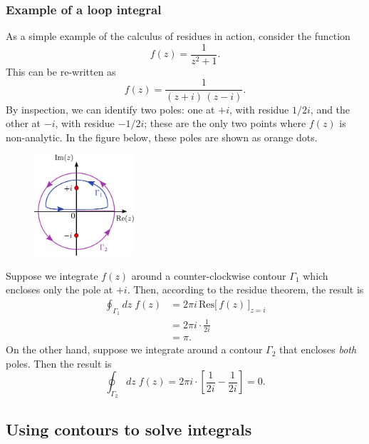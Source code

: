 \documentclass[10pt,a4paper]{article}
\begin{document}
\subsubsection{Example of a loop integral}
\label{example-of-a-loop-integral}

As a simple example of the calculus of residues in action, consider the
function
\begin{equation}
f(z) = \frac{1}{z^2 + 1}.
\end{equation}
This can be re-written as
\begin{equation}
f(z) = \frac{1}{(z + i)\,(z-i)}.
\end{equation}
By inspection, we can identify two poles: one at $+i$, with residue
$1/2i$, and the other at $-i$, with residue $-1/2i$; these are the
only two points where $f(z)$ is non-analytic. In the figure below,
these poles are shown as orange dots.

\begin{figure}[h]
  \centering\includegraphics[width=0.33\textwidth]{contour_example1}
\end{figure}

Suppose we integrate $f(z)$ around a counter-clockwise contour
$\Gamma_1$ which encloses only the pole at $+i$. Then, according to
the residue theorem, the result is
\begin{align}
  \oint_{\Gamma_1}dz \; f(z) &= 2\pi i\, \mathrm{Res}\big[\,f(z)\,\big]_{z = i} \\ &= 2\pi i \cdot \frac{1}{2i} \\& = \pi.
\end{align}
On the other hand, suppose we integrate around a contour $\Gamma_2$
that encloses \emph{both} poles. Then the result is
\begin{equation}
\oint_{\Gamma_2}dz \; f(z) = 2\pi i \cdot \left[\frac{1}{2i} - \frac{1}{2i}\right] = 0.
\end{equation}
   
\subsection{Using contours to solve integrals}
\label{using-contours-to-solve-integrals}
\end{document}
